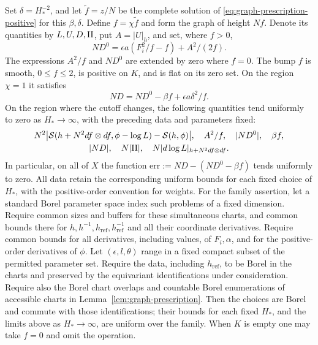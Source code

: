 \begin{lemma}
Set \(\delta=H_*^{-2}\), and let \(\widetilde f=z/N\) be the
complete solution of \eqref{eq:graph-prescription-positive} for
this \(\beta,\delta\).  Define \(f=\chi\widetilde f\) and form the
graph of height \(Nf\).  Denote its quantities by \(L,U,D,\mathrm{II}\),
put \(A=|U|_h\), and set, where \(f>0\),
\begin{equation}
 ND^0=\epsilon a(F_i^2/f-f)+A^2/(2f).
 \label{eq:graph-ideal-prescription}
\end{equation}
The expressions \(A^2/f\) and \(ND^0\) are extended by zero
where \(f=0\).  The bump \(f\) is smooth,
\(0\le f\le2\), is positive on \(K\), and is flat on its zero set.
On the region \(\chi=1\) it satisfies
\begin{equation}
 ND=ND^0-\beta f+\epsilon a\delta^2/f .
 \label{eq:graph-core-prescription}
\end{equation}
On the region where the cutoff changes, the following quantities
tend uniformly to zero as \(H_*\to\infty\), with the preceding
data and parameters fixed:
\begin{equation}
 \begin{gathered}
 N^2\bigl|\mathcal S(h+N^2df\otimes df,\phi-\log L)
                      -\mathcal S(h,\phi)\bigr|,\quad
 A^2/f,\quad |ND^0|,\quad \beta f,\\
 |ND|,\quad N|\mathrm{II}|,\quad N|d\log L|_{h+N^2df\otimes df}.
 \end{gathered}
 \label{eq:graph-cutoff-small}
\end{equation}
In particular, on all of \(X\) the function
\(\mathrm{err}:=ND-(ND^0-\beta f)\) tends uniformly to zero.
All data retain the corresponding uniform bounds for each fixed
choice of \(H_*\), with the positive-order convention for weights.
For the family assertion, let a standard Borel parameter space index
such problems of a fixed dimension.  Require common sizes and buffers
for these simultaneous charts, and common bounds there for
\(h,h^{-1},h_{\mathrm{ref}},h_{\mathrm{ref}}^{-1}\) and all their
coordinate derivatives.  Require common bounds for all derivatives,
including values, of \(F_i,\alpha\), and for the positive-order
derivatives of \(\phi\).  Let \((\epsilon,l,\theta)\) range in a fixed
compact subset of the permitted parameter set.  Require the data,
including \(h_{\mathrm{ref}}\), to
be Borel in the charts and preserved by the equivariant identifications
under consideration.  Require also the Borel chart overlaps and
countable Borel enumerations of accessible charts in
Lemma~\ref{lem:graph-prescription}.  Then the choices are Borel and
commute with those identifications; their bounds for each fixed
\(H_*\), and the limits above as \(H_*\to\infty\), are uniform over
the family.  When \(K\) is empty one may take \(f=0\) and omit the
operation.
\end{lemma}

